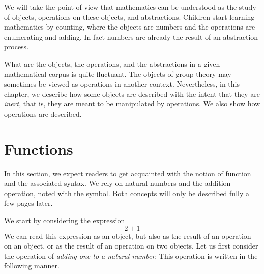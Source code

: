 \label{ch:prog}

% 
% 

We will take the point of view that mathematics can be understood as
the study of objects, operations on these objects, and abstractions.  
Children start learning mathematics by counting, where the objects are
numbers and the operations are enumerating and adding.  In fact
numbers are already the result of an abstraction process.

What are the objects, the operations, and the abstractions in a given
mathematical corpus is quite fluctuant.  The objects of group theory
may sometimes be viewed as operations in another context.  Nevertheless,
in this chapter, we describe how some objects are described with the intent
that they are {\em inert}, that is, they are meant to be
manipulated by operations.  We also show how operations are described.

\section{Functions}
In this section, we expect readers to get acquainted with the notion
of function and the associated syntax.  We rely on natural
numbers and the addition operation, noted with the \C{+} symbol.
Both concepts will only be described fully a few pages later.

We start by considering the expression
\[ 2 + 1 \]
We can read this expression as an object, but also as the result of an
operation on an object, or as the result of an operation on two
objects.  Let us first consider the operation of {\em adding one to
a natural number}.  This operation is written in the following manner.

